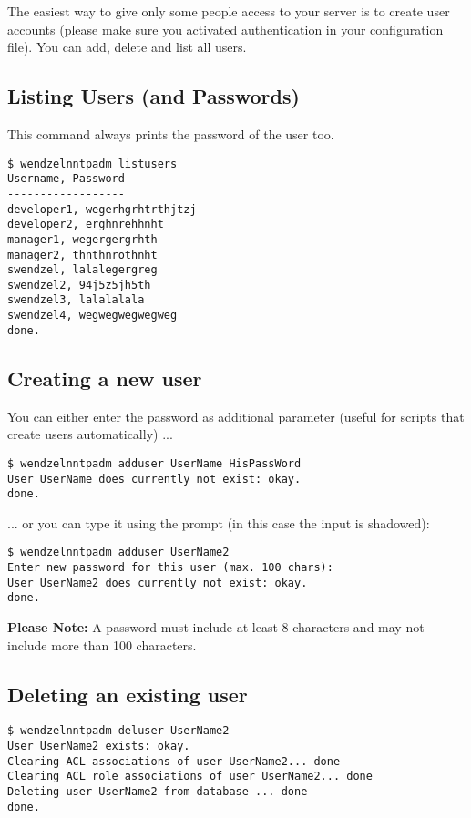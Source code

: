 The easiest way to give only some people access to your server is to create user accounts (please make sure you activated authentication in your configuration file). You can add, delete and list all users.

\subsection{Listing Users (and Passwords)}

This command always prints the password of the user too.

\begin{verbatim}
$ wendzelnntpadm listusers
Username, Password
------------------
developer1, wegerhgrhtrthjtzj
developer2, erghnrehhnht
manager1, wegergergrhth
manager2, thnthnrothnht
swendzel, lalalegergreg
swendzel2, 94j5z5jh5th
swendzel3, lalalalala
swendzel4, wegwegwegwegweg
done.
\end{verbatim}

\subsection{Creating a new user}

You can either enter the password as additional parameter (useful for scripts that create users automatically) ...

\begin{verbatim}
$ wendzelnntpadm adduser UserName HisPassWord
User UserName does currently not exist: okay.
done.
\end{verbatim}

... or you can type it using the prompt (in this case the input is shadowed):

\begin{verbatim}
$ wendzelnntpadm adduser UserName2
Enter new password for this user (max. 100 chars):
User UserName2 does currently not exist: okay.
done.
\end{verbatim}

\textbf{Please Note:} A password must include at least 8 characters and may not include more than 100 characters.

\subsection{Deleting an existing user}

\begin{verbatim}
$ wendzelnntpadm deluser UserName2
User UserName2 exists: okay.
Clearing ACL associations of user UserName2... done
Clearing ACL role associations of user UserName2... done
Deleting user UserName2 from database ... done
done.
\end{verbatim}

